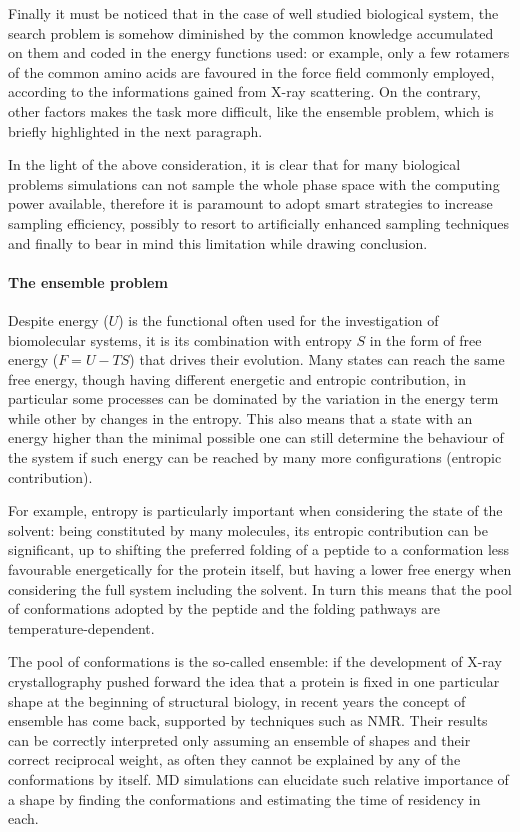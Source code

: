 Finally it must be noticed that in the case of well studied biological system, the search problem is somehow diminished by the common knowledge accumulated on them and coded in the energy functions used: or example, only a few rotamers of the common amino acids are favoured in the force field commonly employed, according to the informations gained from X-ray scattering.
%
On the contrary, other factors makes the task more difficult, like the ensemble problem, which is briefly highlighted in the next paragraph.

In the light of the above consideration, it is clear that for many biological problems simulations can  not sample the whole phase space with the computing power available, therefore it is paramount to adopt smart strategies to increase sampling efficiency, possibly to resort to artificially enhanced sampling techniques and finally to bear in mind this limitation while drawing conclusion.


\paragraph{The ensemble problem}

Despite energy ($U$) is the functional often used for the investigation of biomolecular systems, it is its combination with entropy $S$ in the form of free energy ($F = U - TS$) that drives their evolution. Many states can reach the same free energy, though having different energetic and entropic contribution, in particular some processes can be dominated by the variation in the energy term while other by changes in the entropy.
%
This also means that a state with an energy higher than the minimal possible one can still determine the behaviour of the system if such energy can be reached by many more configurations (entropic contribution).

For example, entropy is particularly important when considering the state of the solvent: being constituted by many molecules, its entropic contribution can be significant, up to shifting the preferred folding of a peptide to a conformation less favourable energetically for the protein itself, but having a lower free energy when considering the full system including the solvent.
%
In turn this means that the pool of conformations adopted by the peptide and the folding pathways are temperature-dependent.

The pool of conformations is the so-called ensemble: if the development of X-ray crystallography pushed forward the idea that a protein is fixed in one particular shape at the beginning of structural biology, in recent years the concept of ensemble has come back, supported by techniques such as NMR. Their results can be correctly interpreted only assuming an ensemble of shapes and their correct reciprocal weight, as often they cannot be explained by any of the conformations by itself. MD simulations can elucidate such relative importance of a shape by finding the conformations and estimating the time of residency in each.

